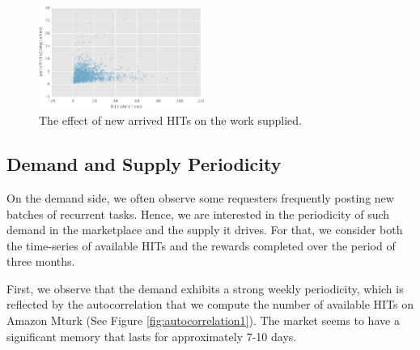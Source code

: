 \begin{figure}[tb]
	\centering
		\includegraphics[width=0.48\textwidth]{figures/percHitsCompleted.pdf}
	\caption{The effect of new arrived HITs on the work  supplied.}
	\label{fig:perc_hits_completed}
\end{figure}

\subsection{Demand and Supply Periodicity}
On the demand side, we often observe some requesters frequently posting new batches of recurrent tasks. Hence, we are interested in the periodicity of such demand in the marketplace and the supply it drives. For that, we consider both the time-series of available HITs and the rewards completed over the period of three months. 

First, we observe that the demand exhibits a strong weekly periodicity, which is reflected by the autocorrelation that we compute the number of available HITs on Amazon Mturk (See Figure \ref{fig:autocorrelation1}). The market seems to have a significant memory that lasts for approximately 7-10 days.

